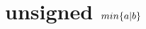 \documentclass{article}
\begin{document}
\begin{comment}
When $i_a \ne -1$, $i_a = max(i_0, bsr(xi01))$. Without using $max$,
this can be computed as follows:
\begin{lstlisting}
    uint32_t xa = xi0 | xi01; 
    uint32_t ia = bsr(xa|1);
    return ia;
}
\end{lstlisting}

Then, to compute $up(a_{min}, i_a)$:
\begin{lstlisting}
uint32_t up(uint32_t amin, uint32_t amax, uint32_t bmin){
    uint32_t mask = (1 << i_a(amin,amax,bmin))-1;
    return amin&~mask;
}
\end{lstlisting}

Again, setting $a_{min,i} = 1$ has no effect on $c_{min}$, so it is not
performed.

Altogether, the algorithm expressed in C is as follows:
\begin{lstlisting}
#include <stdint.h>
uint32_t minand(uint32_t amin, uint32_t amax, uint32_t bmin, uint32_t bmax){
    uint32_t xa1 = ~amin& amax& bmin;
    uint32_t xa0 = ~amin& amax&~bmin;
    uint32_t xb1 =  amin&     &~bmin& bmax;
    uint32_t xb0 = ~amin&     &~bmin& bmax;
    xa0 |= ((1 << bsr(xa1|1))-1)&~amin&~bmin;
    xb0 |= ((1 << bsr(xb1|1))-1)&~amin&~bmin;
    if(xa0 > xb0) amin &= ~((1 << bsr(xa0))-1);
    else bmin &= ~((1 << bsr(xb0))-1);
    return amin&bmin;
}
\end{lstlisting}

Note that 

\begin{lstlisting}
cmin = (amin&~amask)&(bmin&~bmask);
\end{lstlisting}

can be rearranged to

\begin{lstlisting}
cmin = (amin&bmin)&~(amask|bmask);
\end{lstlisting}

Thus, we can reduce the algorithm a bit to
\begin{lstlisting}
#include <stdint.h>
uint32_t minand(uint32_t amin, uint32_t amax, uint32_t bmin, uint32_t bmax){
    uint32_t x1 = (~amin&amax& bmin)|(~bmin&bmax& amin);
    uint32_t x0 = (~amin&amax&~bmin)|(~bmin&bmax&~amin);
    uint32_t imask = x0 | (((1 << bsr(x1|1))-1)&~amin&~bmin);
    return amin&bmin & ~((1 << bsr(imask|1))-1);
}
\end{lstlisting}
\end{comment}

\section{unsigned $min\{a\text{\textbar} b\}$}
\end{document}
